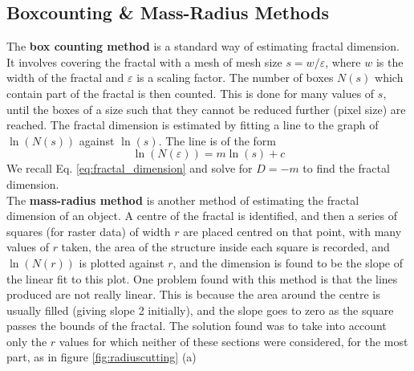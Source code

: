 \documentclass{article}
\theoremstyle{definition}
\theoremstyle{remark}
\begin{document}
\subsection{Boxcounting \& Mass-Radius Methods}\label{sec:fractalmethods}
\indent The \textbf{box counting method} is a standard way of estimating fractal dimension. It involves covering the fractal with a mesh of mesh size $s = w/\varepsilon$, where $w$ is the width of the fractal and $\varepsilon$ is a scaling factor. The number of boxes $N(s)$ which contain part of the fractal is then counted. This is done for many values of $s$, until the boxes of a size such that they cannot be reduced further (pixel size) are reached. The fractal dimension is estimated by fitting a line to the graph of $\ln(N(s))$ against $\ln(s)$. The line is of the form
\begin{equation}
        \ln(N(\varepsilon)) = m\ln(s) + c
\end{equation}
We recall Eq. \ref{eq:fractal_dimension} and solve for $D=-m$ to find the fractal dimension.\\
\indent The \textbf{mass-radius method} is another method of estimating the fractal dimension of an object. A centre of the fractal is identified, and then a series of squares (for raster data) of width $r$ are placed centred on that point, with many values of $r$ taken, the area of the structure inside each square is recorded, and $\ln(N(r))$ is plotted against $r$, and the dimension is found to be the slope of the linear fit to this plot. One problem found with this method is that the lines produced are not really linear. This is because the area around the centre is usually filled (giving slope 2 initially), and the slope goes to zero as the square passes the bounds of the fractal. The solution found was to take into account only the $r$ values for which neither of these sections were considered, for the most part, as in figure \ref{fig:radiuscutting} (a)\\
\end{document}
